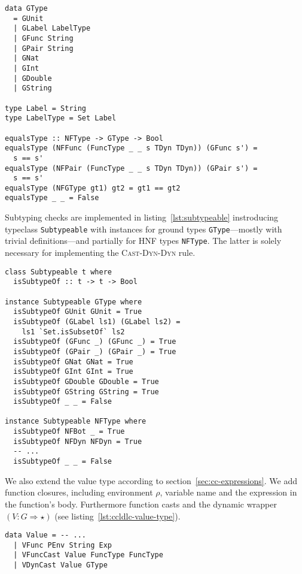 \begin{lstlisting}[float,
  caption=Ground type definition (\texttt{ProcessEnvironment.hs}),
  label=lst:gtype]
data GType
  = GUnit
  | GLabel LabelType
  | GFunc String
  | GPair String
  | GNat
  | GInt
  | GDouble
  | GString

type Label = String
type LabelType = Set Label

equalsType :: NFType -> GType -> Bool
equalsType (NFFunc (FuncType _ _ s TDyn TDyn)) (GFunc s') =
  s == s'
equalsType (NFPair (FuncType _ _ s TDyn TDyn)) (GPair s') =
  s == s'
equalsType (NFGType gt1) gt2 = gt1 == gt2
equalsType _ _ = False
\end{lstlisting}

Subtyping checks are implemented in listing~\ref{lst:subtypeable} instroducing typeclass \texttt{Subtypeable} with instances for ground types \texttt{GType}---mostly with trivial definitions---and partially for HNF types \texttt{NFType}. The latter is solely necessary for implementing the \textsc{Cast-Dyn-Dyn} rule.

\begin{lstlisting}[float,
  label=lst:subtypeable,
  caption=Subtypeable typeclass (\texttt{ProcessEnvironment.hs})]
class Subtypeable t where
  isSubtypeOf :: t -> t -> Bool

instance Subtypeable GType where
  isSubtypeOf GUnit GUnit = True
  isSubtypeOf (GLabel ls1) (GLabel ls2) =
    ls1 `Set.isSubsetOf` ls2
  isSubtypeOf (GFunc _) (GFunc _) = True
  isSubtypeOf (GPair _) (GPair _) = True
  isSubtypeOf GNat GNat = True
  isSubtypeOf GInt GInt = True
  isSubtypeOf GDouble GDouble = True
  isSubtypeOf GString GString = True
  isSubtypeOf _ _ = False

instance Subtypeable NFType where
  isSubtypeOf NFBot _ = True
  isSubtypeOf NFDyn NFDyn = True
  -- ...
  isSubtypeOf _ _ = False
\end{lstlisting}

We also extend the value type according to section~\ref{sec:cc-expressions}. We add function closures, including environment $\rho$, variable name and the expression in the function's body. Furthermore function casts and the dynamic wrapper $(V : G \Rightarrow \star)$ (see listing~\ref{lst:ccldlc-value-type}).

\begin{lstlisting}[float,
  label=lst:ccldlc-value-type,
  caption=Value type extensions (\texttt{ProcessEnvironment.hs})]
data Value = -- ...
  | VFunc PEnv String Exp
  | VFuncCast Value FuncType FuncType
  | VDynCast Value GType
\end{lstlisting}

